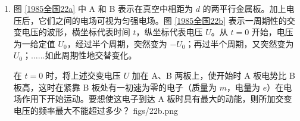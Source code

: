 \documentclass[\gkver]{gaokaozhenti}
\begin{document}
\begin{enumerate}
{电势能的增加量 $\Delta E_{p}=qEl\sin\varphi$（e）

所以得
$mgl(1-\cos\varphi)=qEl\sin\varphi$（f）

化简得
$1-\cos\varphi=\frac{qE}{mg}$，则 $\tan\frac{\varphi}{2}=\frac{qE}{mg}=\tan\alpha$，即 $\varphi=2\alpha$（g）

故细线与竖直方向的夹角为 $2\alpha$ 时，满足要求。

\onepicture[w=3.5cm]{}

评分标准：全题 12 分。（1）4 分，（2）8 分。（1）中，正确判断出电荷正负的，给 1 分；（a）、（b）两式列对一个的，给 1 分，两个都列对的，给 2 分；得出（c）式的，再给 1 分；没列（a）、（b）式直接写出（c）式的，也给 3 分。（2）中，正确列出重力势能的变化（或重力做功）即（d）式的，给 2 分；正确列出电势能的变化（或电场力做功）即（e）式的，给 2 分；列出（f）式的，给 3 分；得出最后结果（g）式的，再给 1 分。
}

\item
图 \ref{1985全国22a} 中 A 和 B 表示在真空中相距为 $d$ 的两平行金属板。加上电压后，它们之间的电场可视为匀强电场。图 \ref{1985全国22b} 表示一周期性的交变电压的波形，横坐标代表时间 $t$，纵坐标代表电压 $U$。从 $t=0$ 开始，电压为一给定值 $U_{0}$，经过半个周期，突然变为 $-U_{0}$；再过半个周期，又突然变为 $U_{0}$；$\ldots\ldots$如此周期性地交替变化。

在 $t=0$ 时，将上述交变电压 $U$ 加在 A、B 两板上，使开始时 A 板电势比 B 板高，这时在紧靠 B 板处有一初速为零的电子（质量为 $m$，电量为 $e$）在电场作用下开始运动。要想使这电子到达 A 板时具有最大的动能，则所加交变电压的频率最大不能超过多少？
{figs/22b.png}


\end{enumerate}
\end{document}
